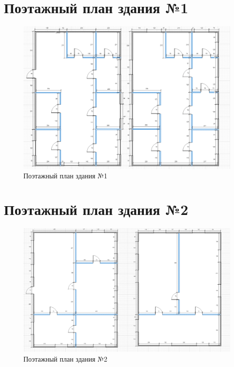 \documentclass[a4paper,14pt,russian]{article}
\begin{document}
\section{Поэтажный план здания №1}
\begin{figure}
  \includegraphics[scale=0.58]{./1-building.png}
 \caption{Поэтажный план здания №1}
\end{figure}
\section{Поэтажный план здания №2}
\begin{figure}
  \includegraphics[scale=0.50]{./2-building.png}
 \caption{Поэтажный план здания №2}
\end{figure}
\end{document}
